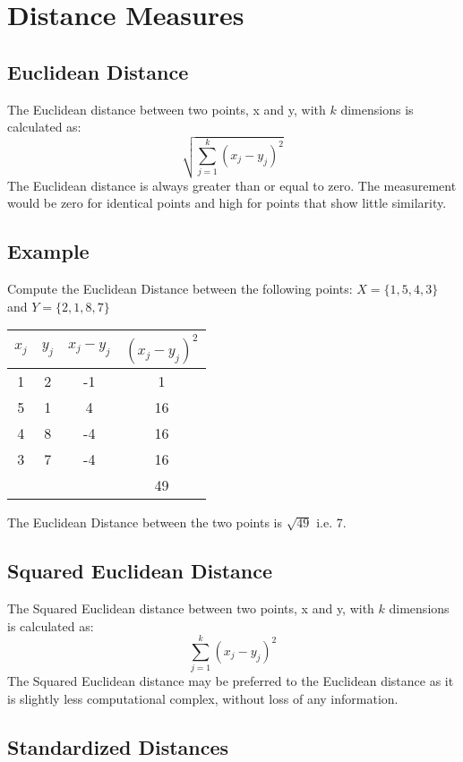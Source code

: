 \documentclass[SKLCluster.tex]{subfiles}
\begin{document}
\section{Distance Measures}
\subsection{Euclidean Distance}
The Euclidean distance between two points, x and y, with $k$ dimensions is calculated as:
\[ \sqrt{ \sum^{k}_{j=1} ( x_j - y_j)^2 } \]
The Euclidean distance is always greater than or equal to zero. The measurement would be zero for identical points and high for points that show little similarity.

\subsection*{Example}
Compute the Euclidean Distance between the following points:
$X = \{1,5,4,3\}$ and $Y = \{2,1,8,7\}$

\begin{center}
\begin{tabular}{|c|c|c|c|}
  \hline
$x_j$	&	$y_j$	&   $x_j - y_j$	&	$(x_j - y_j)^2$	\\ \hline
1	&	2	&	-1	&	1	\\
5	&	1	&	4	&	16	\\
4	&	8	&	-4	&	16	\\
3	&	7	&	-4	&	16	\\ \hline
	&		&		&	49	\\ \hline
\end{tabular}
\end{center}
The Euclidean Distance between the two points is $\sqrt{49}$ i.e. 7.

\subsection{Squared Euclidean Distance}
The Squared Euclidean distance between two points, x and y, with $k$ dimensions is calculated as:
\[ \sum^{k}_{j=1} ( x_j - y_j)^2  \]
The Squared Euclidean distance may be preferred to the Euclidean distance as it is slightly less computational complex, without loss of any information.


\subsection{Standardized Distances}
\end{document}
